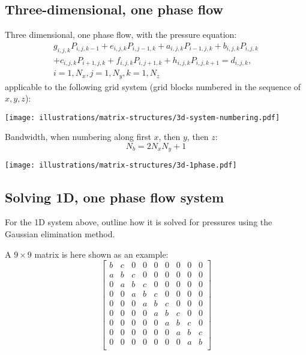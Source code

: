 \subsection{Three-dimensional, one phase flow} %
\label{sub:three_dimensional_one_phase_flow}

\begin{question}
  Three dimensional, one phase flow, with the pressure equation:
  \begin{multline*}
    g_{i,j,k}P_{i,j,k-1}+e_{i,j,k}P_{i,j-1,k}+a_{i,j,k}P_{i-1,j,k}+b_{i,j,k}P_{i,j,k} \\
    +c_{i,j,k}P_{i+1,j,k}+f_{i,j,k}P_{i,j+1,k}+h_{i,j,k}P_{i,j,k+1}=d_{i,j,k}, \\
    i=1,N_{x},j=1,N_{y},k=1,N_{z}
  \end{multline*}
  applicable to the following grid system (grid blocks numbered in the sequence of $x,y,z$):

  \begin{center}
    \texttt{[image: illustrations/matrix-structures/3d-system-numbering.pdf]}
  \end{center}
\end{question}

Bandwidth, when numbering along first $x$, then  $y$, then $z$:
\begin{equation}
  N_b = 2N_x N_y +1 \nonumber
\end{equation}

\begin{center}
  \texttt{[image: illustrations/matrix-structures/3d-1phase.pdf]}
\end{center}


\subsection{Solving 1D, one phase flow system} %
\label{sub:solving_1d_one_phase_flow_system}

\begin{question}
  For the 1D system above, outline how it is solved for pressures using the Gaussian elimination method.
\end{question}
A $9\times 9$ matrix is here shown as an example:
\small{%
\[
  \begin{bmatrix}
    b & c & 0 & 0 & 0 & 0 & 0 & 0 & 0 \\
    a & b & c & 0 & 0 & 0 & 0 & 0 & 0 \\
    0 & a & b & c & 0 & 0 & 0 & 0 & 0 \\
    0 & 0 & a & b & c & 0 & 0 & 0 & 0 \\
    0 & 0 & 0 & a & b & c & 0 & 0 & 0 \\
    0 & 0 & 0 & 0 & a & b & c & 0 & 0 \\
    0 & 0 & 0 & 0 & 0 & a & b & c & 0 \\
    0 & 0 & 0 & 0 & 0 & 0 & a & b & c \\
    0 & 0 & 0 & 0 & 0 & 0 & 0 & a & b \\
  \end{bmatrix}
\]
}

